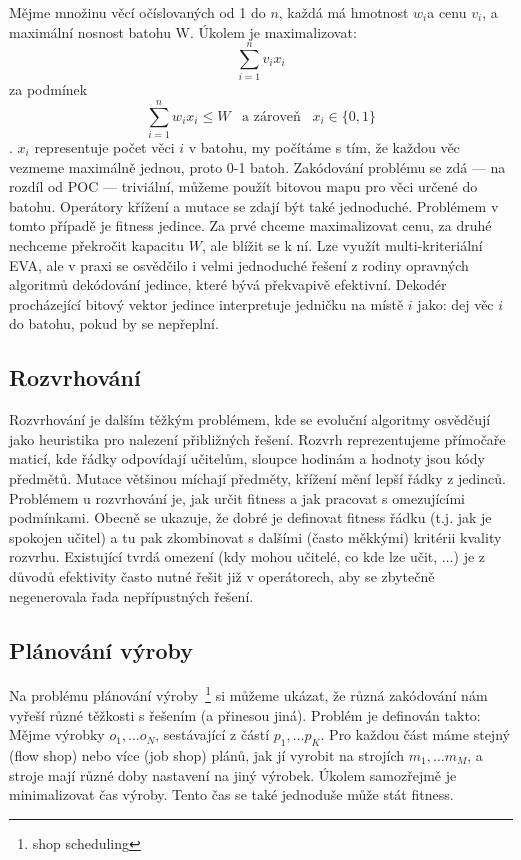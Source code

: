 Mějme množinu věcí očíslovaných od 1 do $n$, každá má hmotnost $w_i$a cenu $v_i$, a maximální nosnost batohu W. Úkolem je
maximalizovat: $$\sum _{i=1}^{n}v_{i}x_{i}$$ za podmínek $$\sum _{i=1}^{n}w_{i}x_{i}\leq W\;\;\; \mbox{a zároveň}\;\;\; x_{i}\in \{0,1\}$$.
$x_i$ representuje počet věci $i$ v batohu, my počítáme s tím, že každou věc vezmeme maximálně jednou, proto 0-1 batoh. Zakódování problému se zdá --- na rozdíl od POC --- triviální, můžeme použít bitovou mapu pro věci určené do batohu. Operátory křížení a mutace se zdají být také jednoduché. Problémem v tomto případě je fitness jedince. Za prvé chceme maximalizovat cenu, za druhé nechceme překročit kapacitu $W$, ale blížit se k ní. Lze využít multi-kriteriální EVA, ale v praxi se osvědčilo i velmi jednoduché řešení z rodiny opravných algoritmů dekódování jedince, které bývá překvapivě efektivní. Dekodér procházející bitový vektor jedince interpretuje jedničku na místě $i$ jako: dej věc $i$ do batohu, pokud by se nepřeplní. 

\subsection{Rozvrhování}

Rozvrhování je dalším těžkým problémem, kde se evoluční algoritmy osvědčují jako heuristika pro nalezení přibližných řešení. Rozvrh reprezentujeme přímočaře maticí, kde řádky odpovídají učitelům, sloupce hodinám a hodnoty jsou kódy předmětů. Mutace většinou míchají předměty, křížení mění lepší řádky z jedinců. Problémem u rozvrhování je, jak určit fitness a jak pracovat s omezujícími podmínkami. Obecně se ukazuje, že dobré je definovat fitness řádku (t.j. jak je spokojen učitel) a tu pak zkombinovat s dalšími (často měkkými) kritérii kvality rozvrhu. Existující tvrdá omezení (kdy mohou učitelé, co kde lze učit, $\dots$) je z důvodů efektivity často nutné řešit již v operátorech, aby se zbytečně negenerovala řada nepřípustných řešení.   

\subsection{Plánování výroby}
Na problému plánování výroby~\footnote{shop scheduling} si můžeme ukázat, že různá zakódování nám vyřeší různé těžkosti s řešením (a přinesou jiná). Problém je definován takto: Mějme výrobky $o_1,\dots o_N$, sestávající z částí $p_1, \dots p_K$. Pro každou část máme stejný (flow shop) nebo více (job shop) plánů, jak jí vyrobit na strojích $m_1, \dots m_M$, a stroje mají různé doby nastavení na jiný výrobek. Úkolem samozřejmě je minimalizovat čas výroby. Tento čas se také jednoduše může stát fitness. 


